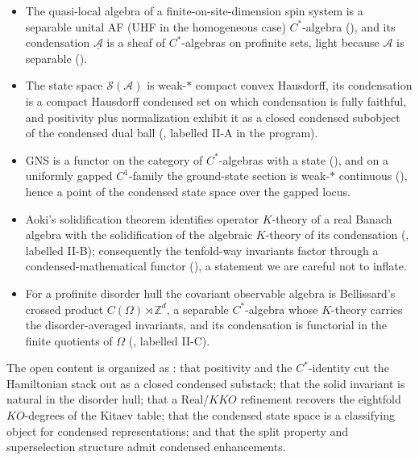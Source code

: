 \documentclass[12pt]{article}
\newcommand{\cond}[1]{\underline{#1}}          %
\newcommand{\dis}{\Omega}                       %
\newcommand{\qla}{\mathcal{A}}                  %
\newcommand{\St}{\mathcal{S}}                   %
\newcommand{\ZZ}{\mathbb{Z}}
\theoremstyle{plain}
\begin{document}
\begin{itemize}
\item The quasi-local algebra of a finite-on-site-dimension spin system is a
separable unital AF (UHF in the homogeneous case) $C^{*}$-algebra
(), and its condensation $\cond{\qla}$ is a sheaf of $C^{*}$-algebras
on profinite sets, light because $\qla$ is separable ().

\item The state space $\St(\qla)$ is weak-$\ast$ compact convex Hausdorff, its
condensation is a compact Hausdorff condensed set on which condensation is fully
faithful, and positivity plus normalization exhibit it as a closed condensed
subobject of the condensed dual ball (, labelled II-A in the
program).

\item GNS is a functor on the category of $C^{*}$-algebras with a state
(), and on a uniformly gapped $C^{1}$-family the ground-state
section is weak-$\ast$ continuous (), hence a point of the
condensed state space over the gapped locus.

\item Aoki's solidification theorem identifies operator $K$-theory of a real Banach
algebra with the solidification of the algebraic $K$-theory of its condensation
(, labelled II-B); consequently the tenfold-way invariants factor
through a condensed-mathematical functor (), a statement we
are careful not to inflate.

\item For a profinite disorder hull the covariant observable algebra is Bellissard's
crossed product $C(\dis)\rtimes\ZZ^{d}$, a separable $C^{*}$-algebra whose
$K$-theory carries the disorder-averaged invariants, and its condensation is
functorial in the finite quotients of $\dis$ (, labelled II-C).
\end{itemize}

The open content is organized as :
that positivity and the $C^{*}$-identity cut the Hamiltonian stack out as a closed
condensed substack; that the solid invariant is natural in the disorder hull; that
a Real/$KKO$ refinement recovers the eightfold $KO$-degrees of the Kitaev table;
that the condensed state space is a classifying object for condensed
representations; and that the split property and superselection structure admit
condensed enhancements.
\end{document}
